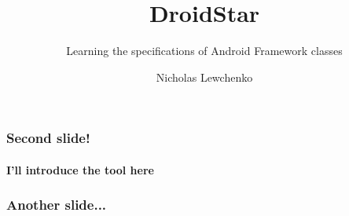\documentclass{beamer}
\title{DroidStar}
\subtitle{Learning the specifications of Android Framework classes}
\author{Nicholas Lewchenko\inst{1}}
\begin{document}
\frame{\titlepage}

\begin{frame}
  \frametitle{Second slide!}
  \framesubtitle{I'll introduce the tool here}
\end{frame}

\begin{frame}
  \frametitle{Another slide...}
\end{frame}
\end{document}

